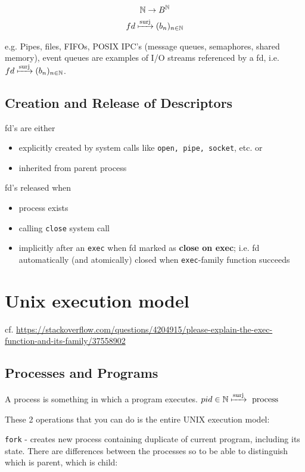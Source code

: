 \documentclass[10pt]{amsart}
\begin{document}
\begin{multicols*}{2}
\[
\begin{gathered}
\mathbb{N} \to B^{\mathbb{N}} \\
fd \xmapsto{\text{surj}} (b_n)_{n \in \mathbb{N}}
\end{gathered}
\]

e.g. Pipes, files, FIFOs, POSIX IPC's (message queues, semaphores, shared memory), event queues are examples of I/O streams referenced by a fd, i.e. $fd \xmapsto{\text{surj}} (b_n)_{n \in \mathbb{N}}$.

\subsection{Creation and Release of Descriptors}

fd's are either 
\begin{itemize}
	\item explicitly created by system calls like \texttt{open, pipe, socket}, etc. or 
	\item inherited from parent process
\end{itemize}

fd's released when
\begin{itemize}
	\item process exists
	\item calling \texttt{close} system call
	\item implicitly after an \texttt{exec} when fd marked as \textbf{close on exec}; i.e. fd automatically (and atomically) closed when \texttt{exec}-family function succeeds
\end{itemize}

\section{Unix execution model}

cf. \url{https://stackoverflow.com/questions/4204915/please-explain-the-exec-function-and-its-family/37558902}

\subsection{Processes and Programs}

A process is something in which a program executes. $pid \in \mathbb{N} \xmapsto{\text{surj}} \text{ process }$

These 2 operations that you can do is the entire UNIX execution model:

\texttt{fork} - creates new process containing duplicate of current program, including its state. There are differences between the processes so to be able to distinguish which is parent, which is child:


\end{multicols*}
\end{document}
